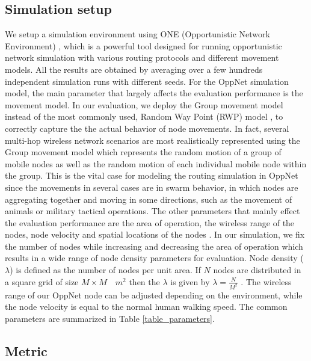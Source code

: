 \documentclass[conference]{IEEEtran}
\begin{document}
\subsection{Simulation setup}
We setup a simulation environment using ONE (Opportunistic Network Environment) \cite{Keranen2009b}, which is a powerful tool designed for running opportunistic network simulation with various routing protocols and different movement models.
All the results are obtained by averaging over a few hundreds independent simulation runs with different seeds.
For the OppNet simulation model, the main parameter that largely affects the evaluation performance is the movement model.
In our evaluation, we deploy the Group movement model instead of the most commonly used, Random Way Point (RWP) model \cite{Batabyal2012}, to correctly capture the the actual behavior of node movements.
In fact, several multi-hop wireless network scenarios are most realistically represented using the Group movement model \cite{Blakely2004} which represents the random motion of a group of mobile nodes as well as the random motion of each individual mobile node within the group.
This is the vital case for modeling the routing simulation in OppNet since the movements in several cases are in swarm behavior, in which nodes are aggregating together and moving in some directions, such as the movement of animals or military tactical operations.
The other parameters that mainly effect the evaluation performance are the area of operation, the wireless range of the nodes, node velocity and spatial locations of the nodes \cite{Batabyal2012}. 
In our simulation, we fix the number of nodes while increasing and decreasing the area of operation which results in a wide range of node density parameters for evaluation.
Node density ($\lambda$) is defined as the number of nodes per unit area. 
If $N$ nodes are distributed in a square grid of size $M \times M \quad{ m }^{ 2 }$ then the $\lambda$ is given by $\lambda =\frac { N }{ { M }^{ 2 } } $ . 
The wireless range of our OppNet node can be adjusted depending on the environment, while the node velocity is equal to the normal human walking speed.
The common parameters are summarized in Table \ref{table_parameters}.

\subsection{Metric}
\end{document}
